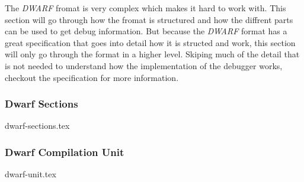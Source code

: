  


The \emph{DWARF} fromat is very complex which makes it hard to work with.
This section will go through how the fromat is structured and how the diffrent parts can be used to get debug information.
But because the \emph{DWARF} format has a great specification that goes into detail how it is structed and work, this section will only go through the format in a higher level.
Skiping much of the detail that is not needed to understand how the implementation of the debugger works, checkout the specification \cite{dwarf} for more information.


\subsubsection{Dwarf Sections}
{dwarf-sections.tex}


\subsubsection{Dwarf Compilation Unit}
{dwarf-unit.tex}


